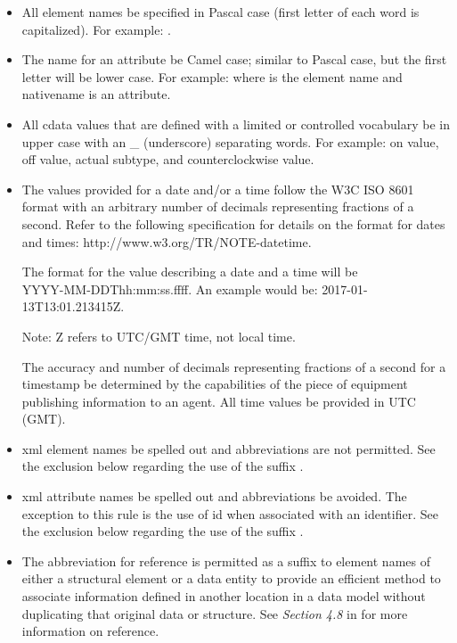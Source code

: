 \begin{itemize}
\item All element names \MUST be specified in Pascal case (first letter of each word is capitalized). For example: .

\item The name for an attribute \MUST be Camel case; similar to Pascal case, but the first letter will be lower case.  For example:  where  is the \gls{element name} and \gls{nativename} is an attribute.

\item All \gls{cdata} values that are defined with a limited or controlled vocabulary \MUST be in upper case with an \_ (underscore) separating words.  For example: \gls{on value}, \gls{off value}, \gls{actual subtype}, and \gls{counterclockwise value}.

\item The values provided for a date and/or a time \MUST follow the W3C ISO 8601 format with an arbitrary number of decimals representing fractions of a second.  Refer to the following specification for details on the format for dates and times:  http://www.w3.org/TR/NOTE-datetime.

The format for the value describing a date and a time will be\\ YYYY-MM-DDThh:mm:ss.ffff. An example would be: 2017-01-13T13:01.213415Z.  

\begin{note}
Note:  Z refers to UTC/GMT time, not local time.

\end{note}

The accuracy and number of decimals representing fractions of a second for a \gls{timestamp} \MUST be determined by the capabilities of the piece of equipment publishing information to an \gls{agent}.  All time values \MUST be provided in UTC (GMT).

\item \gls{xml} element names \MUST be spelled out and abbreviations are not permitted.   See the exclusion below regarding the use of the suffix .

\item \gls{xml} attribute names \SHOULD be spelled out and abbreviations \SHOULD be avoided.  The exception to this rule is the use of \gls{id} when associated with an identifier.  See the exclusion below regarding the use of the suffix .

\item The abbreviation  for \gls{reference} is permitted as a suffix to element names of either a \gls{structural element} or a \gls{data entity} to provide an efficient method to associate information defined in another location in a \gls{data model} without duplicating that original data or structure.  See \textit{Section 4.8} in  for more information on \gls{reference}.
\end{itemize}

